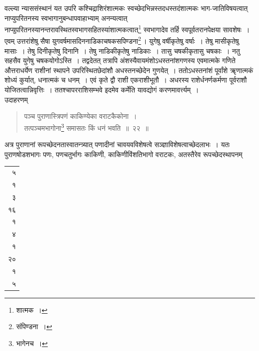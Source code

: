 \documentclass[10pt, openany]{book}
\begin{document}
{वल्ल्या न्याससंस्थानं यत उपरि कश्चिद्राशिरंशात्मकः
स्वच्छेदभिन्नस्तदधस्तदंशात्मकः 
{भाग-जातिविषयत्वात् नाप्युपरितनस्य
स्वभागानुबन्धापवाहाभ्याम् अनन्यत्वात्}
{नाप्युपरितनस्यानन्तरावस्थितस्वभागसहितस्यांशात्मकत्वात्\renewcommand{\thefootnote}{\s २}\footnote{\s *शात्मक~।} स्वभागादेव
तर्हि स्वपूर्वतरानपेक्षया}
{सावशेषः~। एवम् उत्तरांशेषु सैषा युगवर्षमासदिननाडिकाचषकसपिण्डना\renewcommand{\thefootnote}{\s ३}\footnote{\s *संपिण्डना~।}\,।
युगेषु वर्षीकृतेषु वर्षाः~।}
{तेषु मासीकृतेषु मासाः~। तेषु दिनीकृतेषु दिनानि~। तेषु
नाडिकीकृतेषु}
{नाडिकाः~। तासु चषकीकृतासु चषकाः~। नतु सहसैव युगेषु चषकयोगोऽस्ति~।
तद्वदेतत् तत्रापि}
{अंशस्यैवायमंशोऽधस्तनांशगणस्य एवमात्मके गणिते औत्तराधर्येण राशीनां
स्थापने}
{उपरिस्थितछेदांशौ अधस्तनच्छेदेन गुणयेत्~। ततोऽधस्तनांशं पूर्वांशे
ॠणात्मकं शोध्यं}
{कुर्यात्, धनात्मकं च धनम्~। एवं कृते द्वौ राशी एकराशीभूतौ~। अधरस्य
राशेर्धनर्णकर्मणा}
{पूर्वराशौ योजितत्वान्निवृत्तिः~। ततश्चापरराशिसम्भवे इदमेव कर्मेति
यावद्योगं करणमावर्त्त्यम्~।}\\

{उदाहरणम्\textemdash}

\begin{quote}
{\eg पञ्च पुराणास्त्रिपणं काकिण्येका वराटकैकोना~। \\
 तत्पञ्चमभागोना\renewcommand{\thefootnote}{\s ४}\footnote{\s *भागेनच~।} समासतः किं धनं भवति~॥~२२~॥}\end{quote}

{अत्र पुराणानां रूपच्छेदनतास्वातन्त्र्यात् पणादीनां चावयवविशेषत्वे
सञ्ज्ञाविशेषत्वाच्छेदलाभः~।}
{यतः पुराणषोडशभागः पणः, पणचतुर्भागः काकिणी, काकिणीविंशतिभागो}
{वराटकः, अतस्तैरेव रूपच्छेदस्थापनम्\textemdash}


\newpage

\hspace{45mm} \begin{tabular}{|r|} \hline ५\\
 १\\
 ३\\
 १६\\
१ \\
 ४ \\
 १\\
२०\\
\hline
 १\\
 ५ \\
 \hline
 \end{tabular}
\vspace{2mm} 
 
\sanskritfont{}}
\end{document}
